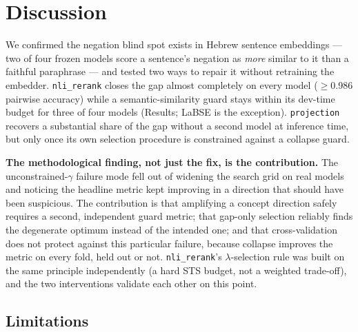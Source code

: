\documentclass{article}
\begin{document}
\section{Discussion}

We confirmed the negation blind spot exists in Hebrew sentence embeddings
--- two of four frozen models score a sentence's negation as \emph{more}
similar to it than a faithful paraphrase --- and tested two ways to repair
it without retraining the embedder. \texttt{nli\_rerank} closes the gap
almost completely on every model ($\geq$0.986 pairwise accuracy) while a
semantic-similarity guard stays within its dev-time budget for three of
four models (Results; LaBSE is the exception). \texttt{projection}
recovers a substantial share of the gap without a second model at
inference time, but only once its own selection procedure is constrained
against a collapse guard.

\textbf{The methodological finding, not just the fix, is the contribution.}
The unconstrained-$\gamma$ failure mode fell out of widening the search
grid on real models and noticing the headline metric kept improving in a
direction that should have been suspicious. The contribution is that
amplifying a concept direction safely requires a second, independent guard
metric; that gap-only selection reliably finds the degenerate optimum
instead of the intended one; and that cross-validation does not protect
against this particular failure, because collapse improves the metric on
every fold, held out or not. \texttt{nli\_rerank}'s $\lambda$-selection
rule was built on the same principle independently (a hard STS budget, not
a weighted trade-off), and the two interventions validate each other on
this point.

\subsection{Limitations}
\end{document}

